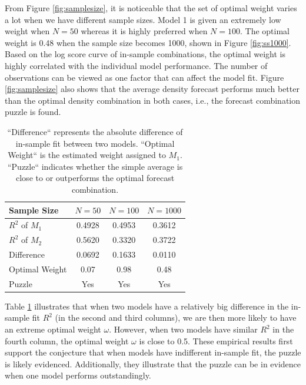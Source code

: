 \documentclass{monashthesis}
\begin{document}
From Figure \ref{fig:samplesize}, it is noticeable that the set of optimal weight varies a lot when we have different sample sizes. Model 1 is given an extremely low weight when \(N=50\) whereas it is highly preferred when \(N=100\). The optimal weight is 0.48 when the sample size becomes 1000, shown in Figure \ref{fig:ss1000}. Based on the log score curve of in-sample combinations, the optimal weight is highly correlated with the individual model performance. The number of observations can be viewed as one factor that can affect the model fit. Figure \ref{fig:samplesize} also shows that the average density forecast performs much better than the optimal density combination in both cases, i.e., the forecast combination puzzle is found.

\begin{table}[ht]
  \centering
    \begin{tabular}{l|ccc}
    \toprule
    Sample Size      &   $N=50$    &    $N=100$   &  $N=1000$  \\
    \midrule
    $R^2$ of $M_1$   &   0.4928    &    0.4953    &   0.3612   \\
    $R^2$ of $M_2$   &   0.5620    &    0.3320    &   0.3722   \\
    Difference       &   0.0692    &    0.1633    &   0.0110   \\
    Optimal Weight   &    0.07     &     0.98     &    0.48    \\
    Puzzle           &    Yes      &     Yes      &    Yes     \\
    \bottomrule
    \end{tabular}
  \caption{``Difference`` represents the absolute difference of in-sample fit between two models. ``Optimal Weight`` is the estimated weight assigned to $M_1$. ``Puzzle`` indicates whether the simple average is close to or outperforms the optimal forecast combination.}
  \label{tab:size}
\end{table}

Table \ref{tab:size} illustrates that when two models have a relatively big difference in the in-sample fit \(R^2\) (in the second and third columns), we are then more likely to have an extreme optimal weight \(\omega\). However, when two models have similar \(R^2\) in the fourth column, the optimal weight \(\omega\) is close to 0.5. These empirical results first support the conjecture that when models have indifferent in-sample fit, the puzzle is likely evidenced. Additionally, they illustrate that the puzzle can be in evidence when one model performs outstandingly.
\end{document}
